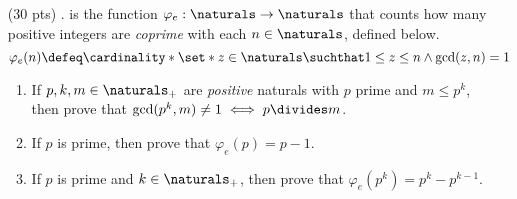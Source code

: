\begin{enumerate}
  \item[(30 pts) \quad 5.]
     is the function $\varphi_e: \naturals \to \naturals$ that counts how many positive integers are \emph{coprime} with each $n \in \naturals$, defined below.
    \begin{equation*}
      \varphi_e(n)
      \defeq \cardinality*{\set*{z \in \naturals \suchthat 1 \leq z \leq n \land \gcd(z, n) = 1}}
    \end{equation*}
    \begin{enumerate}
      \item
        If $p, k, m \in \naturals_+$ are \emph{positive} naturals with $p$ prime and $m \leq p^k$, then prove that $\gcd(p^k, m) \neq 1 \iff p \divides m$.
      \item
        If $p$ is prime, then prove that $\varphi_e(p) = p - 1$.
      \item
        If $p$ is prime and $k \in \naturals_+$, then prove that $\varphi_e(p^k) = p^k - p^{k - 1}$.%
    \end{enumerate}
\end{enumerate}


